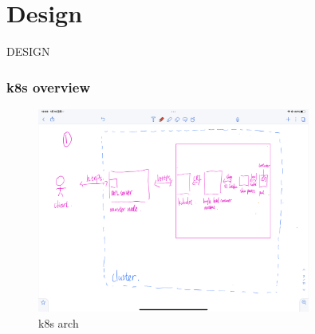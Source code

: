 \chapter{Design}
\label{sec:design}





DESIGN





\subsection{k8s overview}

    \begin{figure}[H]
        \centering
        \includegraphics[width=0.8\textwidth]{images/IMG_4416.PNG}
        \caption[k8s arch]{k8s arch}
        \label{fig:k8s}
    \end{figure}

